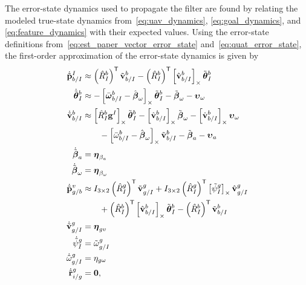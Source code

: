 The error-state dynamics used to propagate the filter are found by relating
the modeled true-state dynamics from~\eqref{eq:uav_dynamics},
\eqref{eq:goal_dynamics}, and \eqref{eq:feature_dynamics}
with their expected values. Using the error-state definitions
from~\eqref{eq:est_paper_vector_error_state} and~\eqref{eq:quat_error_state}, the
first-order approximation of the error-state dynamics is given by 
\begin{align}
  \dot{\tilde{\boldsymbol{\mathrm{p}}}}_{b/I}^I
  &\approx
  \left( \hat{R}_I^b \right)^{\mathsf{T}} \tilde{\boldsymbol{\mathrm{v}}}_{b/I}^b
  - \left( \hat{R}_I^b \right)^{\mathsf{T}} \left[ \hat{\boldsymbol{\mathrm{v}}}_{b/I}^b \right]_{\times}
  \tilde{\boldsymbol{\mathrm{\theta}}}_I^b
  \\
  \dot{\tilde{\boldsymbol{\mathrm{\theta}}}}_{I}^{b} 
  &\approx 	
  -\left[  \bar{\boldsymbol{\mathrm{\omega}}}_{b/I}^b - \hat{\boldsymbol{\mathrm{\beta}}}_\omega \right]_{\times}
    \tilde{\boldsymbol{\mathrm{\theta}}}_I^b
    - \tilde{\boldsymbol{\mathrm{\beta}}}_\omega -
    \boldsymbol{\mathrm{\upsilon}}_\omega
  \nonumber \\
  \dot{\tilde{\boldsymbol{\mathrm{v}}}}_{b/I}^b 
  &\approx
  \left[  \hat{R}_I^b \boldsymbol{\mathrm{g}}^I  \right]_{\times} \tilde{\boldsymbol{\mathrm{\theta}}}_I^b 
  -
  \left[  \hat{\boldsymbol{\mathrm{v}}}_{b/I}^b  \right]_{\times} \tilde{\boldsymbol{\mathrm{\beta}}}_\omega
  -
  \left[  \hat{\boldsymbol{\mathrm{v}}}_{b/I}^b  \right]_{\times} \boldsymbol{\mathrm{\upsilon}}_\omega
  \nonumber \\
  & \qquad -
  \left[  \bar{\omega}_{b/I}^b - \hat{\boldsymbol{\mathrm{\beta}}}_\omega  \right]_{\times}
  \tilde{\boldsymbol{\mathrm{v}}}_{b/I}^b
  -
  \tilde{\boldsymbol{\mathrm{\beta}}}_a
  -
  \boldsymbol{\mathrm{\upsilon}}_a \nonumber
  \\
  \dot{\tilde{\boldsymbol{\mathrm{\beta}}}}_a &= \boldsymbol{\mathrm{\eta}}_{\beta_a} \nonumber
  \\
  \dot{\tilde{\boldsymbol{\mathrm{\beta}}}}_\omega &= \boldsymbol{\mathrm{\eta}}_{\beta_\omega} \nonumber
  \\
  \dot{\tilde{\boldsymbol{\mathrm{p}}}}_{g/b}^{v}
                                  &\approx
  I_{3 \times 2} \left( \hat{R}_{I}^{g} \right)^{\mathsf{T}}
  \tilde{\boldsymbol{\mathrm{v}}}_{g/I}^g
  +
  I_{3 \times 2} \left( \hat{R}_{I}^{g} \right)^{\mathsf{T}}
  \left[  \tilde{\psi}_I^g  \right]_{\times} \hat{\boldsymbol{\mathrm{v}}}_{g/I}^g
  \nonumber \\
  & \qquad +
  \left( \hat{R}_{I}^{b} \right)^{\mathsf{T}} \left[  \hat{\boldsymbol{\mathrm{v}}}_{b/I}^{b}  \right]_{\times} 
  \tilde{\boldsymbol{\mathrm{\theta}}}_I^b
  -
  \left( \hat{R}_{I}^{b} \right)^{\mathsf{T}} \tilde{\boldsymbol{\mathrm{v}}}_{b/I}^{b} \nonumber \\
  \dot{\tilde{\boldsymbol{\mathrm{v}}}}_{g/I}^{g} &= \boldsymbol{\mathrm{\eta}}_{gv} \nonumber \\
  \dot{\tilde{\psi}}_{I}^{g} &= \tilde{\omega}_{g/I}^g \nonumber \\
  \dot{\tilde{\omega}}_{g/I}^{g} &= \eta_{g\omega} \nonumber \\
  \dot{\tilde{\boldsymbol{\mathrm{r}}}}_{i/g}^g &= \boldsymbol{\mathrm{0}}, \nonumber
\end{align}
